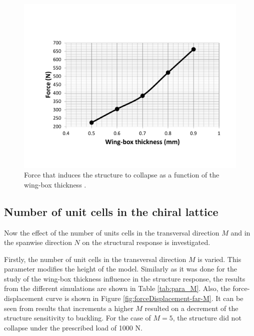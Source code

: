    \begin{figure}[!htpb] %
      \centering
      \includegraphics[width=0.8 \textwidth]{../figures/result-sim/cbox/force_cbox_t}
      \caption[Force that induces the structure to collapse as a function of the wing-box thickness]{Force that induces the structure to collapse as a function of the wing-box thickness \boxt.}\label{fig:force_cbox_t}
    \end{figure}

  \clearpage
  \subsection{Number of unit cells in the chiral lattice} \label{subsec:MandN_para}

    Now the effect of the number of units cells in the transversal direction $M$ and in the spanwise direction $N$ on the structural response is investigated.

    Firstly, the number of unit cells in the transversal direction $M$ is varied. This parameter modifies the height of the model. Similarly as it was done for the study of the wing-box thickness \boxt influence in the structure response, the results from the different simulations are shown in Table \ref{tab:para_M}. Also, the force-displacement curve is shown in Figure \ref{fig:forceDisplacement-far-M}. It can be seen from results that increments a higher $M$ resulted on a decrement of the structure sensitivity to buckling. For the case of $M = 5$, the structure did not collapse under the prescribed load of 1000 N.

